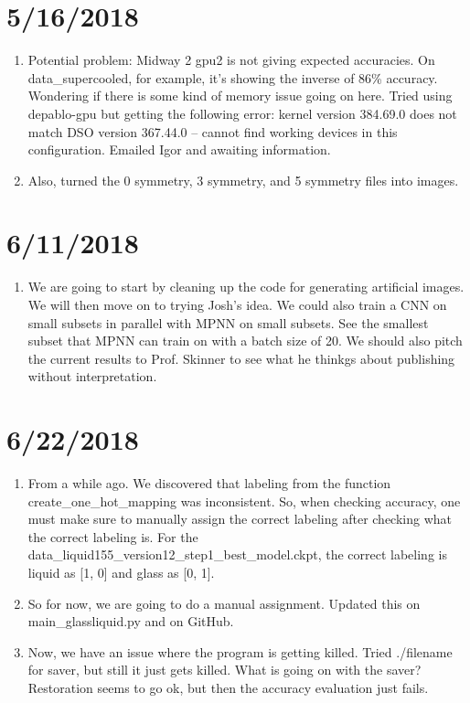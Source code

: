 \documentclass[12pt,reqno]{amsart}
\numberwithin{equation}{section}
\begin{document}
\section{5/16/2018}
\begin{enumerate}
\item Potential problem: Midway 2 gpu2 is not giving expected accuracies.  On data\_supercooled, for example, it's showing the inverse of 86\% accuracy.  Wondering if there is some kind of memory issue going on here.  Tried using depablo-gpu but getting the following error: kernel version 384.69.0 does not match DSO version 367.44.0 -- cannot find working devices in this configuration.  Emailed Igor and awaiting information.  
\item Also, turned the 0 symmetry, 3 symmetry, and 5 symmetry files into images. 
\end{enumerate}

\section{6/11/2018}
\begin{enumerate}
\item We are going to start by cleaning up the code for generating artificial images.  We will then move on to trying Josh's idea.  We could also train a CNN on small subsets in parallel with MPNN on small subsets.  See the smallest subset that MPNN can train on with a batch size of 20.  We should also pitch the current results to Prof. Skinner to see what he thinkgs about publishing without interpretation.   
\end{enumerate}

\section{6/22/2018}
\begin{enumerate}
\item From a while ago.  We discovered that labeling from the function create\_one\_hot\_mapping was inconsistent.  So, when checking accuracy, one must make sure to manually assign the correct labeling after checking what the correct labeling is.  For the data\_liquid155\_version12\_step1\_best\_model.ckpt, the correct labeling is liquid as [1, 0] and glass as [0, 1].  
\item So for now, we are going to do a manual assignment.  Updated this on main\_glassliquid.py and on GitHub.
\item Now, we have an issue where the program is getting killed.  Tried ./filename for saver, but still it just gets killed.  What is going on with the saver?  Restoration seems to go ok, but then the accuracy evaluation just fails.    
\end{enumerate}
\end{document}
